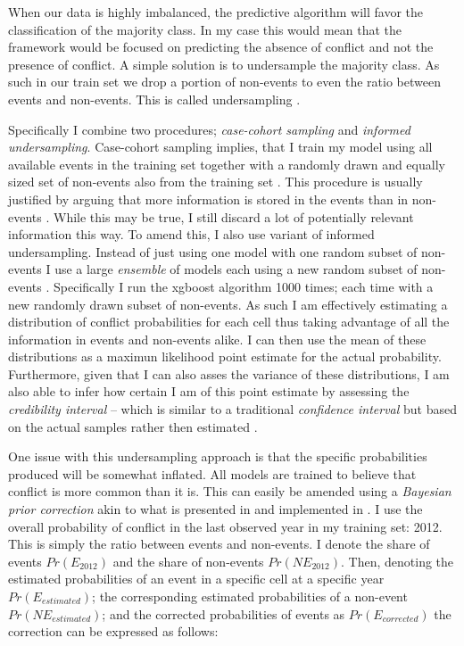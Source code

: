 \documentclass[a4paper]{article}
\begin{document}
When our data is highly imbalanced, the predictive algorithm will favor the classification of the majority class. In my case this would mean that the framework would be focused on predicting the absence of conflict and not the presence of conflict. A simple solution is to undersample the majority class. As such in our train set we drop a portion of non-events to even the ratio between events and non-events. This is called undersampling \citep[1266-1267]{He_2008}.\par


Specifically I combine two procedures; \emph{case-cohort sampling} and \emph{informed undersampling}. Case-cohort sampling implies, that I train my model using all available events in the training set together with a randomly drawn and equally sized set of non-events also from the training set \citep[142]{King_Zeng_2001}. This procedure is usually justified by arguing that more information is stored in the events than in non-events \cite[139]{King_Zeng_2001}. While this may be true, I still discard a lot of potentially relevant information this way. To amend this, I also use variant of informed undersampling. Instead of just using one model with one random subset of non-events I use a large \emph{ensemble} of models each using a new random subset of non-events \cite[1267]{He_2008}. Specifically I run the xgboost algorithm 1000 times; each time with a new randomly drawn subset of non-events. As such I am effectively estimating a distribution of conflict probabilities for each cell thus taking advantage of all the information in events and non-events alike. I can then use the mean of these distributions as a maximun likelihood point estimate for the actual probability. Furthermore, given that I can also asses the variance of these distributions, I am also able to infer how certain I am of this point estimate by assessing the \emph{credibility interval} -- which is similar to a traditional \emph{confidence interval} but based on the actual samples rather then estimated \citep[54]{Mcelreath_2018}.\par 

One issue with this undersampling approach is that the specific probabilities produced will be somewhat inflated. All models are trained to believe that conflict is more common than it is. This can easily be amended using a \emph{Bayesian prior correction} akin to what is presented in \cite{King_Zeng_2001, king_zeng_2001b} and implemented in \cite{Goldstone_2010}. I use the overall probability of conflict in the last observed year in my training set: 2012. This is simply the ratio between events and non-events. I denote the share of events $Pr(E_{2012})$ and the share of non-events $Pr(NE_{2012})$. Then, denoting the estimated probabilities of an event in a specific cell at a specific year $Pr(E_{estimated})$; the corresponding estimated probabilities of a non-event $Pr(NE_{estimated})$; and the corrected probabilities of events as $Pr(E_{corrected})$ the correction can be expressed as follows:
\end{document}
